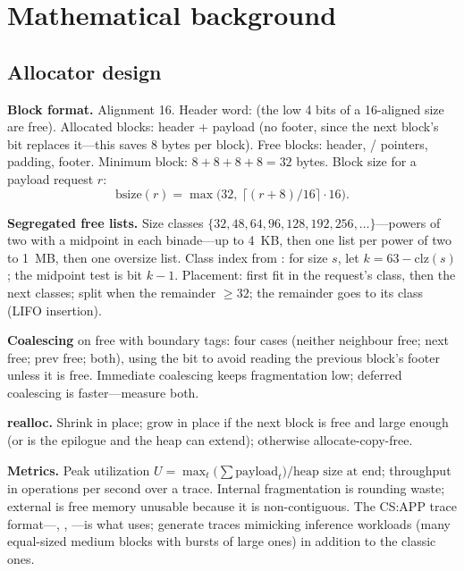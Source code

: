 \section{Mathematical background}

\subsection{Allocator design}

\textbf{Block format.} Alignment 16. Header word:  (the low 4 bits of a 16-aligned size are free). Allocated blocks: header + payload (no footer, since the next block's  bit replaces it---this saves 8 bytes per block). Free blocks: header, / pointers, padding, footer. Minimum block: $8 + 8 + 8 + 8 = 32$ bytes. Block size for a payload request $r$:
\begin{equation}
\text{bsize}(r) = \max\big(32,\ \lceil (r + 8)/16 \rceil \cdot 16\big).
\end{equation}

\textbf{Segregated free lists.} Size classes $\{32, 48, 64, 96, 128, 192, 256, \dots\}$---powers of two with a midpoint in each binade---up to 4~KB, then one list per power of two to 1~MB, then one oversize list. Class index from : for size $s$, let $k = 63 - \mathrm{clz}(s)$; the midpoint test is bit $k-1$. Placement: first fit in the request's class, then the next classes; split when the remainder $\ge 32$; the remainder goes to its class (LIFO insertion).

\textbf{Coalescing} on free with boundary tags: four cases (neither neighbour free; next free; prev free; both), using the  bit to avoid reading the previous block's footer unless it is free. Immediate coalescing keeps fragmentation low; deferred coalescing is faster---measure both.

\textbf{realloc.} Shrink in place; grow in place if the next block is free and large enough (or is the epilogue and the heap can extend); otherwise allocate-copy-free.

\textbf{Metrics.} Peak utilization $U = \max_t \big(\sum \text{payload}_t\big) / \text{heap size at end}$; throughput in operations per second over a trace. Internal fragmentation is rounding waste; external is free memory unusable because it is non-contiguous. The CS:APP trace format---, , ---is what  uses; generate traces mimicking inference workloads (many equal-sized medium blocks with bursts of large ones) in addition to the classic ones.

